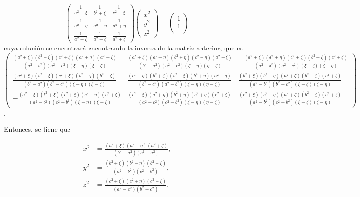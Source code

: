 \documentclass[paper=letter, fontsize=12pt,]{article}
\begin{document}
\begin{equation*}
    \begin{pmatrix}
    \frac{1}{a^2+\xi} & \frac{1}{b^2+\xi} & \frac{1}{c^2+\xi}\\
    \frac{1}{a^2+\eta} & \frac{1}{a^2+\eta} & \frac{1}{a^2+\eta}\\
    \frac{1}{a^2+\zeta} & \frac{1}{a^2+\zeta} & \frac{1}{a^2+\zeta}\end{pmatrix}\begin{pmatrix}
        x^2\\
        y^2\\
        z^2
    \end{pmatrix}=\begin{pmatrix}
        1\\
        1\\
    \end{pmatrix}
\end{equation*}
cuya solución se encontrará encontrando la inversa de la matriz anterior, que es \cite{Miguel}
\begin{equation*}
    \begin{pmatrix}
        \frac{(a^2+\xi)(b^2+\xi)(c^2+\xi)(a^2+\eta)(a^2+\zeta)}{(a^2-b^2)(a^2-c^2)(\xi-\eta)(\xi-\zeta)} & \frac{(a^2+\xi)(a^2+\eta)(b^2+\eta)(c^2+\eta)(a^2+\xi)}{(b^2-a^2)(a^2-c^2)(\zeta-\eta)(\eta-\zeta)} & -\frac{(a^2+\xi)(a^2+\eta)(a^2+\zeta)(b^2+\zeta)(c^2+\zeta)}{(a^2-b^2)(a^2-c^2)(\xi-\zeta)(\zeta-\eta)}\\
        \frac{(a^2+\xi)(b^2+\xi)(c^2+\xi)(b^2+\eta)(b^2+\zeta)}{(b^2-a^2)(b^2-c^2)(\xi-\eta)(\xi-\zeta)} &\frac{(c^2+\eta)(b^2+\zeta)(b^2+\xi)(b^2+\eta)(a^2+\eta)}{(b^2-c^2)(a^2-b^2)(\xi-\eta)(\eta-\zeta)} &\frac{(b^2+\xi)(b^2+\eta)(a^2+\zeta)(b^2+\zeta)(c^2+\zeta)}{(a^2-b^2)(b^2-c^2)(\xi-\zeta)(\zeta-\eta)}\\
        -\frac{(a^2+\xi)(b^2+\xi)(c^2+\xi)(c^2+\eta)(c^2+\zeta)}{(a^2-c^2)(c^2-b^2)(\xi-\eta)(\xi-\zeta)} & \frac{(c^2+\xi)(a^2+\eta)(b^2+\eta)(c^2+\eta)(c^2+\zeta)}{(a^2-c^2)(c^2-b^2)(\xi-\eta)(\eta-\zeta)} &
        \frac{(c^2+\xi)(c^2+\eta)(a^2+\zeta)(b^2+\zeta)(c^2+\zeta)}{(a^2-b^2)(c^2-b^2)(\xi-\zeta)(\zeta-\eta)}
    \end{pmatrix}
\end{equation*}.

Entonces, se tiene que

\begin{align}
    x^2&=\frac{(a^2+\xi)(a^2+\eta)(a^2+\zeta)}{(b^2-a^2)(c^2-a^2)},\label{def_x}\\
     y^2&=\frac{(b^2+\xi)(b^2+\eta)(b^2+\zeta)}{(a^2-b^2)(c^2-b^2)},\\
     z^2&=\frac{(c^2+\xi)(c^2+\eta)(c^2+\zeta)}{(a^2-c^2)(b^2-c^2)}.    
\end{align}
\end{document}
